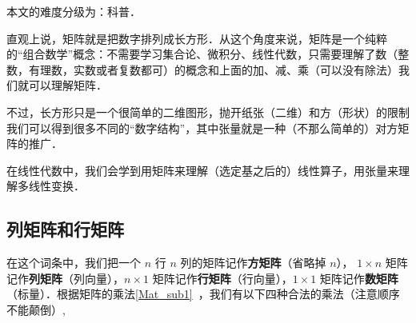 
\begin{issues}
\issueDraft
\end{issues}



本文的难度分级为：科普．


直观上说，矩阵就是把数字排列成长方形．从这个角度来说，矩阵是一个纯粹的“组合数学”概念：不需要学习集合论、微积分、线性代数，只需要理解了数（整数，有理数，实数或者复数都可）的概念和上面的加、减、乘（可以没有除法）我们就可以理解矩阵．

不过，长方形只是一个很简单的二维图形，抛开纸张（二维）和方（形状）的限制我们可以得到很多不同的“数字结构”，其中张量就是一种（不那么简单的）对方矩阵的推广．

在线性代数中，我们会学到用矩阵来理解（选定基之后的）线性算子，用张量来理解多线性变换．

\subsection{列矩阵和行矩阵}
在这个词条中，我们把一个 $n$ 行 $n$ 列的矩阵记作\textbf{方矩阵}（省略掉 $n$）， $1 \times n$ 矩阵记作\textbf{列矩阵}（列向量），$n \times 1$ 矩阵记作\textbf{行矩阵}（行向量），$1 \times 1$ 矩阵记作\textbf{数矩阵}（标量）．根据矩阵的乘法\autoref{Mat_sub1}~，我们有以下四种合法的乘法（注意顺序不能颠倒）,

